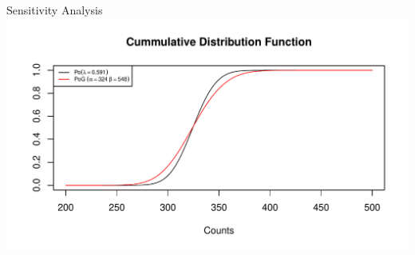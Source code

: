 \documentclass[english]{beamer}\usepackage[]{graphicx}\usepackage[]{xcolor}
\makeatletter
\def\maxwidth{ %
  \ifdim\Gin@nat@width>\linewidth
    \linewidth
  \else
    \Gin@nat@width
  \fi
}
\newenvironment{knitrout}{}{} %
\makeatother
\begin{document}
\begin{frame}{Sensitivity Analysis}
\begin{knitrout}
\color{fgcolor}
\includegraphics[width=\maxwidth]{figures/figunnamed-chunk-10-1} 
\end{knitrout}

\end{frame}


% 

% 
\end{document}
